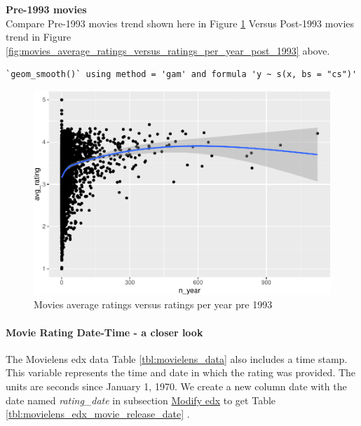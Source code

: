 \documentclass[
]{article}
\begin{document}
\newpage

\textbf{Pre-1993 movies}\\
Compare Pre-1993 movies trend shown here in Figure
\ref{fig:movies_average_ratings_versus_ratings_per_year_pre_1993} Versus
Post-1993 movies trend in Figure
\ref{fig:movies_average_ratings_versus_ratings_per_year_post_1993}
above.

\begin{verbatim}
`geom_smooth()` using method = 'gam' and formula 'y ~ s(x, bs = "cs")'
\end{verbatim}

\begin{figure}
\centering
\includegraphics{figures/md_5-1.pdf}
\caption{Movies average ratings versus ratings per year pre
1993\label{fig:movies_average_ratings_versus_ratings_per_year_pre_1993}}
\end{figure}

\newpage

\hypertarget{movie-rating-date-time---a-closer-look}{%
\paragraph{Movie Rating Date-Time - a closer
look}\label{movie-rating-date-time---a-closer-look}}

The Movielens edx data Table \ref{tbl:movielens_data} also includes a
time stamp. This variable represents the time and date in which the
rating was provided. The units are seconds since January 1, 1970. We
create a new column date with the date named \emph{rating\_date} in
subsection \protect\hyperlink{modify_edx}{Modify edx} to get Table
\ref{tbl:movielens_edx_movie_release_date} .
\end{document}
